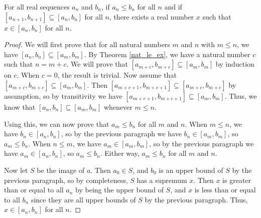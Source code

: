 \documentclass[../../math.tex]{subfiles}
\begin{document}
\begin{theorem} \label{real_nested_interval}
    For all real sequences $a_n$ and $b_n$, if $a_n \leq b_n$ for all $n$ and if
    $[a_{n+1}, b_{n+1}] \subseteq [a_n, b_n]$ for all $n$, there exists a real
    number $x$ such that $x \in [a_n, b_n]$ for all $n$.
\end{theorem}
\begin{proof}
    We will first prove that for all natural numbers $m$ and $n$ with $m \leq
    n$, we have $[a_n, b_n] \subseteq [a_m, b_m]$.  By Theorem \ref{nat_le_ex},
    we have a natural number $c$ such that $n = m + c$.  We will prove that
    $[a_{m + c}, b_{m + c}] \subseteq [a_m, b_m]$ by induction on $c$.  When $c
    = 0$, the result is trivial.  Now assume that $[a_{m + c}, b_{m + c}]
    \subseteq [a_m, b_m]$.  Then $[a_{m + c + 1}, b_{m + c + 1}] \subseteq [a_{m
    + c}, b_{m + c}]$ by assumption, so by transitivity we have $[a_{m + c + 1},
    b_{m + c + 1}] \subseteq [a_m, b_m]$.  Thus, we know that $[a_n, b_n]
    \subseteq [a_m, b_m]$ whenever $m \leq n$.

    Using this, we can now prove that $a_m \leq b_n$ for all $m$ and $n$.  When
    $m \leq n$, we have $b_n \in [a_n, b_n]$, so by the previous paragraph we
    have $b_n \in [a_m, b_m]$, so $a_m \leq b_n$.  When $n \leq m$, we have $a_m
    \in [a_m, b_m]$, so by the previous paragraph we have $a_m \in [a_n, b_n]$,
    so $a_m \leq b_n$.  Either way, $a_m \leq b_n$ for all $m$ and $n$.

    Now let $S$ be the image of $a$.  Then $a_0 \in S$, and $b_0$ is an upper
    bound of $S$ by the previous paragraph, so by completeness, $S$ has a
    supremum $x$.  Then $x$ is greater than or equal to all $a_n$ by being the
    upper bound of $S$, and $x$ is less than or equal to all $b_n$ since they
    are all upper bounds of $S$ by the previous paragraph.  Thus, $x \in [a_n,
    b_n]$ for all $n$.
\end{proof}
\end{document}
